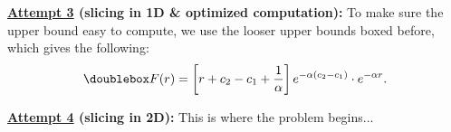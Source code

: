 \documentclass[12pt]{article}
\begin{document}
\textbf{\underline{Attempt 3} (slicing in 1D \& optimized computation):}
To make sure the upper bound easy to compute, we use the looser upper bounds boxed before, which gives the following:
\begin{align*}
    \mdoublebox{F(r) = \brac{r + c_2 - c_1 + \frac{1}{\alpha}}e^{-\alpha(c_2 - c_1)} \cdot e^{-\alpha r}.}
\end{align*}

\textbf{\underline{Attempt 4} (slicing in 2D):} This is where the problem begins...
\end{document}
